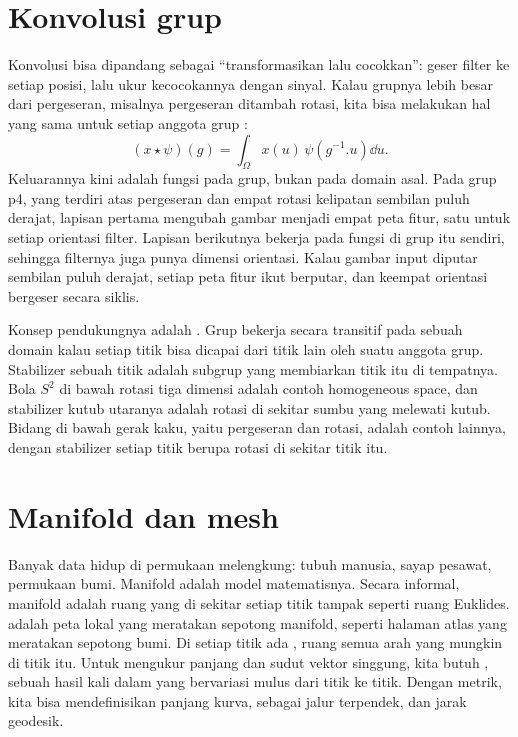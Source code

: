 \section{Konvolusi grup}

Konvolusi bisa dipandang sebagai ``transformasikan lalu cocokkan'': geser filter ke setiap posisi,
lalu ukur kecocokannya dengan sinyal. Kalau grupnya lebih besar dari pergeseran, misalnya
pergeseran ditambah rotasi, kita bisa melakukan hal yang sama untuk setiap anggota grup
\citep{cohen2016}:
\begin{equation}
(x\star\psi)(g)=\int_\Omega x(u)\,\psi(g^{-1}.u)\dd u.
\end{equation}
Keluarannya kini adalah fungsi pada grup, bukan pada domain asal. Pada grup p4, yang terdiri atas
pergeseran dan empat rotasi kelipatan sembilan puluh derajat, lapisan pertama mengubah gambar
menjadi empat peta fitur, satu untuk setiap orientasi filter. Lapisan berikutnya bekerja pada
fungsi di grup itu sendiri, sehingga filternya juga punya dimensi orientasi. Kalau gambar input
diputar sembilan puluh derajat, setiap peta fitur ikut berputar, dan keempat orientasi bergeser
secara siklis.

Konsep pendukungnya adalah . Grup bekerja secara transitif pada sebuah
domain kalau setiap titik bisa dicapai dari titik lain oleh suatu anggota grup. Stabilizer sebuah
titik adalah subgrup yang membiarkan titik itu di tempatnya. Bola $S^2$ di bawah rotasi tiga
dimensi adalah contoh homogeneous space, dan stabilizer kutub utaranya adalah rotasi di sekitar
sumbu yang melewati kutub. Bidang di bawah gerak kaku, yaitu pergeseran dan rotasi, adalah contoh
lainnya, dengan stabilizer setiap titik berupa rotasi di sekitar titik itu.

\section{Manifold dan mesh}

Banyak data hidup di permukaan melengkung: tubuh manusia, sayap pesawat, permukaan bumi. Manifold
adalah model matematisnya. Secara informal, manifold adalah ruang yang di sekitar setiap titik
tampak seperti ruang Euklides.  adalah peta lokal yang meratakan sepotong manifold,
seperti halaman atlas yang meratakan sepotong bumi. Di setiap titik ada ,
ruang semua arah yang mungkin di titik itu. Untuk mengukur panjang dan sudut vektor singgung,
kita butuh , sebuah hasil kali dalam yang bervariasi mulus dari titik ke
titik. Dengan metrik, kita bisa mendefinisikan panjang kurva,  sebagai jalur
terpendek, dan jarak geodesik.


